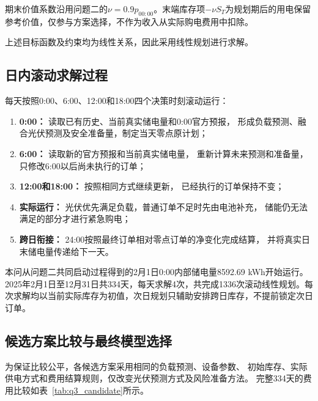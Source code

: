 期末价值系数沿用问题二的$\nu=0.9p_{00:00}$。末端库存项$-\nu S_T$为规划期后的用电保留参考价值，仅参与方案选择，不作为收入从实际购电费用中扣除。

上述目标函数及约束均为线性关系，因此采用线性规划进行求解。


\subsection{日内滚动求解过程}

每天按照0:00、6:00、12:00和18:00四个决策时刻滚动运行：

\begin{enumerate}
    \item \textbf{0:00：}
    读取已有历史、当前真实储电量和0:00官方预报，
    形成负载预测、融合光伏预测及安全准备量，制定当天零点原计划；

    \item \textbf{6:00：}
    读取新的官方预报和当前真实储电量，
    重新计算未来预测和准备量，只修改6:00以后尚未执行的订单；

    \item \textbf{12:00和18:00：}
    按照相同方式继续更新，
    已经执行的订单保持不变；

    \item \textbf{实际运行：}
    光伏优先满足负载，普通订单不足时先由电池补充，
    储能仍无法满足的部分才进行紧急购电；

    \item \textbf{跨日衔接：}
    24:00按照最终订单相对零点订单的净变化完成结算，
    并将真实日末储电量传递给下一天。
\end{enumerate}

本问从问题二共同启动过程得到的2月1日0:00内部储电量8592.69 kWh开始运行。2025年2月1日至12月31日共334天，每天求解4次，共完成1336次滚动线性规划。每次求解均以当前实际库存为初值，次日规划只辅助安排跨日库存，不提前锁定次日订单。


\subsection{候选方案比较与最终模型选择}

为保证比较公平，各候选方案采用相同的负载预测、设备参数、
初始库存、实际供电方式和费用结算规则，仅改变光伏预测方式及风险准备方法。
完整334天的费用比较如表~\ref{tab:q3_candidate}所示。

